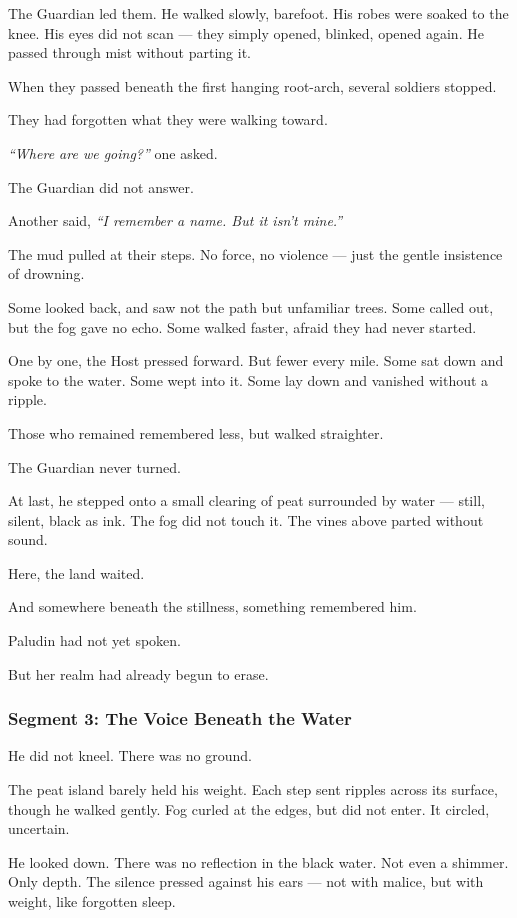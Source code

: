 \documentclass[9pt]{article}
\begin{document}
The Guardian led them. He walked slowly, barefoot. His robes were soaked to the knee. His eyes did not scan — they simply opened, blinked, opened again. He passed through mist without parting it.

When they passed beneath the first hanging root-arch, several soldiers stopped.

They had forgotten what they were walking toward.

\textit{``Where are we going?''} one asked.

The Guardian did not answer.

Another said, \textit{``I remember a name. But it isn't mine.''}

The mud pulled at their steps. No force, no violence — just the gentle insistence of drowning.

Some looked back, and saw not the path but unfamiliar trees. Some called out, but the fog gave no echo. Some walked faster, afraid they had never started.

One by one, the Host pressed forward. But fewer every mile. Some sat down and spoke to the water. Some wept into it. Some lay down and vanished without a ripple.

Those who remained remembered less, but walked straighter.

The Guardian never turned.

At last, he stepped onto a small clearing of peat surrounded by water — still, silent, black as ink. The fog did not touch it. The vines above parted without sound.

Here, the land waited.

And somewhere beneath the stillness, something remembered him.

Paludin had not yet spoken.

But her realm had already begun to erase.

\newpage

\subsubsection*{Segment 3: The Voice Beneath the Water}

He did not kneel. There was no ground.

The peat island barely held his weight. Each step sent ripples across its surface, though he walked gently. Fog curled at the edges, but did not enter. It circled, uncertain.

He looked down. There was no reflection in the black water. Not even a shimmer. Only depth. The silence pressed against his ears — not with malice, but with weight, like forgotten sleep.
\end{document}
